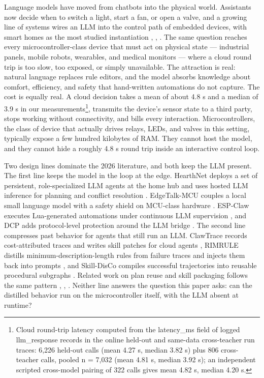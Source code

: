 \documentclass[review]{elsarticle}
\begin{document}
Language models have moved from chatbots into the physical world. Assistants
now decide when to switch a light, start a fan, or open a valve, and a growing
line of systems wires an LLM into the control path of embedded devices, with
smart homes as the most studied instantiation \cite{1}, \cite{2}, \cite{3}.
The same question reaches every microcontroller-class device that must act on
physical state --- industrial panels, mobile robots, wearables, and medical
monitors --- where a cloud round trip is too slow, too exposed, or simply
unavailable.
The attraction is real: natural language replaces rule editors, and the model
absorbs knowledge about comfort, efficiency, and safety that hand-written
automations do not capture. The cost is equally real. A cloud decision takes
a mean of about 4.8 s and a median of 3.9 s in our
measurements\footnote{Cloud round-trip latency computed from the latency\_ms
field of logged llm\_response records in the online held-out and same-data
cross-teacher run traces: 6,226 held-out calls (mean 4.27 s, median 3.82 s)
plus 806 cross-teacher calls, pooled n = 7,032 (mean 4.81 s, median
3.92 s); an independent scripted cross-model pairing of 322 calls gives mean
4.82 s, median 4.20 s.}, transmits the device's sensor state to a third
party, stops working without connectivity, and bills every interaction.
Microcontrollers, the class of device that actually drives
relays, LEDs, and valves in this setting, typically expose a few hundred
kilobytes of RAM. They cannot host the model, and they cannot hide a roughly
4.8 s round trip inside an interactive control loop.

Two design lines dominate the 2026 literature, and both keep the LLM present.
The first line keeps the model in the loop at the edge. HearthNet deploys a
set of persistent, role-specialized LLM agents at the home hub and uses hosted
LLM inference for planning and conflict resolution \cite{1}. EdgeTalk-MCU
couples a local small language model with a safety shield on MCU-class
hardware \cite{2}. ESP-Claw executes Lua-generated automations under
continuous LLM supervision \cite{3}, and DCP adds protocol-level protection
around the LLM bridge \cite{4}. The second line compresses past behavior for
agents that still run an LLM. ClawTrace records cost-attributed traces and
writes skill patches for cloud agents \cite{5}, RIMRULE distills
minimum-description-length rules from failure traces and injects them back
into prompts \cite{6}, and Skill-DisCo compiles successful trajectories into
reusable procedural subgraphs \cite{7}. Related work on plan reuse and skill
packaging follows the same pattern \cite{8}, \cite{9}, \cite{10}. Neither line
answers the question this paper asks: can the distilled behavior run on the
microcontroller itself, with the LLM absent at runtime?
\end{document}
